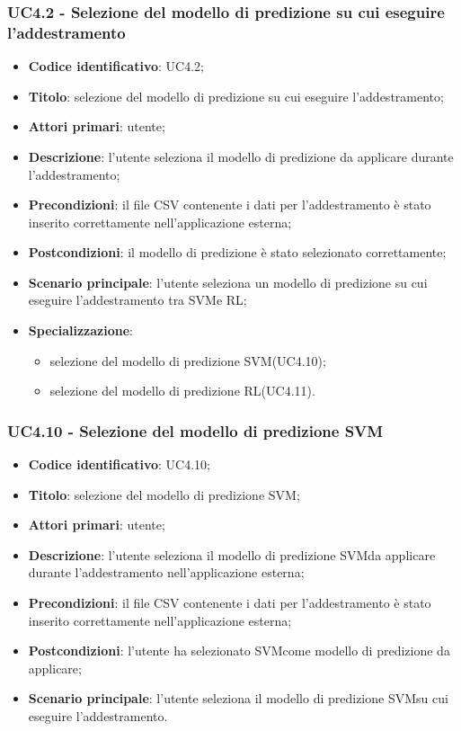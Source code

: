 \subsubsection{UC4.2 - Selezione del modello di predizione su cui eseguire l'addestramento}
\begin{itemize}
    \item \textbf{Codice identificativo}: UC4.2;
    \item \textbf{Titolo}: selezione del modello di predizione su cui eseguire l'addestramento;
    \item \textbf{Attori primari}: utente;
    \item \textbf{Descrizione}: l'utente seleziona il modello di predizione da applicare durante l'addestramento;
    \item \textbf{Precondizioni}: il file CSV contenente i dati per l'addestramento è stato inserito correttamente nell'applicazione esterna;
    \item \textbf{Postcondizioni}: il modello di predizione è stato selezionato correttamente;
    \item \textbf{Scenario principale}: l'utente seleziona un modello di predizione su cui eseguire l'addestramento tra SVM\glosp e RL\glo;
    \item \textbf{Specializzazione}:
    \begin{itemize}
    	\item selezione del modello di predizione SVM\glosp (UC4.10);
    	\item selezione del modello di predizione RL\glosp (UC4.11).
    \end{itemize}   
\end{itemize}
\subsubsection{UC4.10 - Selezione del modello di predizione SVM}
\begin{itemize}
	\item \textbf{Codice identificativo}: UC4.10;
	\item \textbf{Titolo}: selezione del modello di predizione SVM\glo;
	\item \textbf{Attori primari}: utente;
	\item \textbf{Descrizione}: l'utente seleziona il modello di predizione SVM\glosp da applicare durante l'addestramento nell'applicazione esterna;
	\item \textbf{Precondizioni}: il file CSV contenente i dati per l'addestramento è stato inserito correttamente nell'applicazione esterna;
	\item \textbf{Postcondizioni}: l'utente ha selezionato SVM\glosp come modello di predizione da applicare;
	\item \textbf{Scenario principale}: l'utente seleziona il modello di predizione SVM\glosp su cui eseguire l'addestramento.
\end{itemize}
